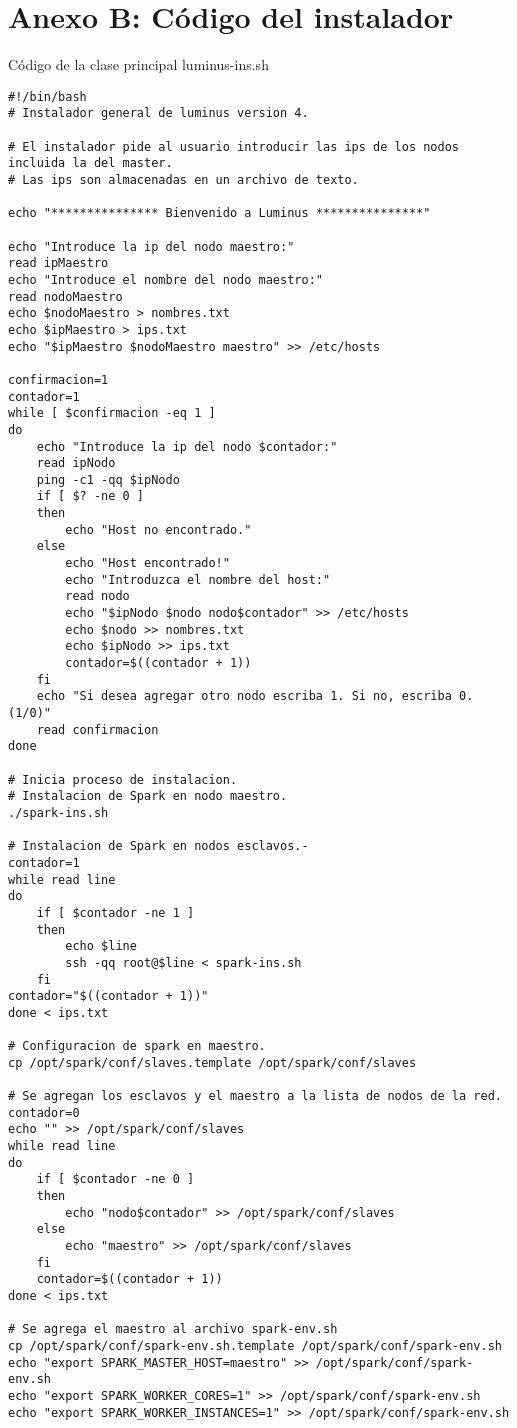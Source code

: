 \section{Anexo B: Código del instalador}
Código de la clase principal luminus-ins.sh
\begin{lstlisting} 
#!/bin/bash
# Instalador general de luminus version 4.

# El instalador pide al usuario introducir las ips de los nodos incluida la del master.
# Las ips son almacenadas en un archivo de texto.

echo "*************** Bienvenido a Luminus ***************"

echo "Introduce la ip del nodo maestro:"
read ipMaestro
echo "Introduce el nombre del nodo maestro:"
read nodoMaestro
echo $nodoMaestro > nombres.txt
echo $ipMaestro > ips.txt
echo "$ipMaestro $nodoMaestro maestro" >> /etc/hosts

confirmacion=1
contador=1
while [ $confirmacion -eq 1 ]
do
	echo "Introduce la ip del nodo $contador:"
	read ipNodo
	ping -c1 -qq $ipNodo
	if [ $? -ne 0 ]
	then
		echo "Host no encontrado."
	else
		echo "Host encontrado!"
		echo "Introduzca el nombre del host:"
		read nodo
		echo "$ipNodo $nodo nodo$contador" >> /etc/hosts
		echo $nodo >> nombres.txt
		echo $ipNodo >> ips.txt
		contador=$((contador + 1))
	fi
	echo "Si desea agregar otro nodo escriba 1. Si no, escriba 0. (1/0)"
	read confirmacion
done

# Inicia proceso de instalacion.
# Instalacion de Spark en nodo maestro.
./spark-ins.sh

# Instalacion de Spark en nodos esclavos.-
contador=1
while read line
do
	if [ $contador -ne 1 ]
	then
		echo $line
		ssh -qq root@$line < spark-ins.sh
	fi
contador="$((contador + 1))"
done < ips.txt

# Configuracion de spark en maestro.
cp /opt/spark/conf/slaves.template /opt/spark/conf/slaves

# Se agregan los esclavos y el maestro a la lista de nodos de la red.
contador=0
echo "" >> /opt/spark/conf/slaves 
while read line
do
	if [ $contador -ne 0 ]
	then
		echo "nodo$contador" >> /opt/spark/conf/slaves 
	else
		echo "maestro" >> /opt/spark/conf/slaves
	fi
	contador=$((contador + 1))
done < ips.txt

# Se agrega el maestro al archivo spark-env.sh
cp /opt/spark/conf/spark-env.sh.template /opt/spark/conf/spark-env.sh
echo "export SPARK_MASTER_HOST=maestro" >> /opt/spark/conf/spark-env.sh
echo "export SPARK_WORKER_CORES=1" >> /opt/spark/conf/spark-env.sh
echo "export SPARK_WORKER_INSTANCES=1" >> /opt/spark/conf/spark-env.sh
\end{lstlisting} 
\newpage

